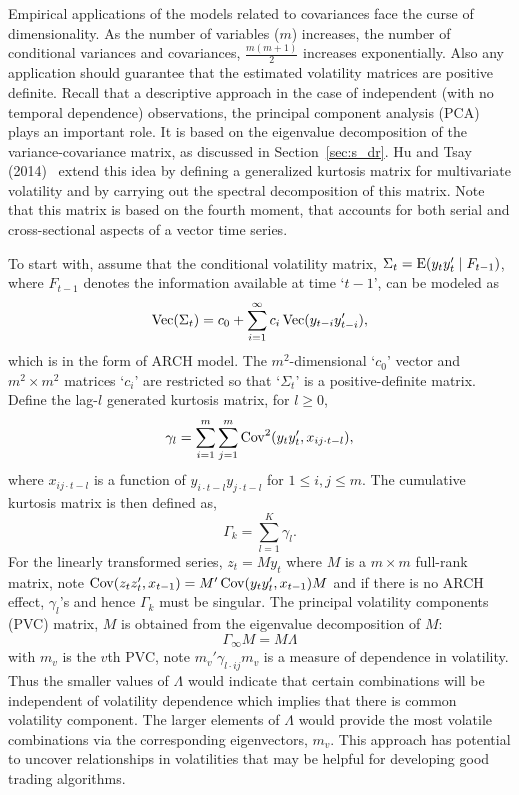 Empirical applications of the models related to covariances face the curse of dimensionality. As the number of variables ($m$) increases, the number of conditional variances and covariances, $\frac{m(m+1)}{2}$ increases exponentially. Also any application should guarantee that the estimated volatility matrices are positive definite. Recall that a descriptive approach in the case of independent (with no temporal dependence) observations, the principal component analysis (PCA) plays an important role. It is based on the eigenvalue decomposition of the variance-covariance matrix, as discussed in Section~\ref{sec:s_dr}. Hu and Tsay (2014)~\cite{hutsay14} extend this idea by defining a generalized kurtosis matrix for multivariate volatility and by carrying out the spectral decomposition of this matrix. Note that this matrix is based on the fourth moment, that accounts for both serial and cross-sectional aspects of a vector time series.


To start with, assume that the conditional volatility matrix, $\Sigma_t= \operatorname{E}(y_ty_t' \;|\; F_{t-1})$, where $F_{t-1}$ denotes the information available at time `$t-1$', can be modeled as
	\begin{equation} \label{eqn:vtmodel}
	\tbvec(\Sigma_t)= c_0 + \sum_{i=1}^\infty c_i \tbvec(y_{t-i} y_{t-i}'),
	\end{equation}
which is in the form of ARCH model. The $m^2$-dimensional `$c_0$' vector and $m^2 \times m^2$ matrices `$c_i$' are restricted so that `$\Sigma_t$' is a positive-definite matrix. Define the lag-$l$ generated kurtosis matrix, for $l \geq 0$,
	\begin{equation} \label{eqn:kurtosismat}
	\gamma_l = \sum_{i=1}^m \sum_{j=1}^m \cov^2(y_t y_t', x_{ij \cdot t - l} ),
	\end{equation}
where $x_{ij \cdot t - l}$ is a function of $y_{i \cdot t-l} y_{j \cdot t-l}$ for $1 \leq i,j \leq m$. The cumulative kurtosis matrix is then defined as,
	\begin{equation} \label{eqn:cumkurt}
	\Gamma_k= \sum_{l=1}^K \gamma_l.
	\end{equation}
For the linearly transformed series, $z_t= My_t$ where $M$ is a $m \times m$ full-rank matrix, note $\operatorname{Cov}(z_tz_t', x_{t-1})=M' \operatorname{Cov}(y_ty_t', x_{t-1}) M$ and if there is no ARCH effect, $\gamma_l$'s and hence $\Gamma_k$ must be singular. The principal volatility components (PVC) matrix, $M$ is obtained from the eigenvalue decomposition of $M$:
	\begin{equation} \label{eqn:obtainM}
	\Gamma_\infty M= M \Lambda
	\end{equation}
with $m_v$ is the $v$th PVC, note $m_v' \gamma_{l \cdot ij} m_v$ is a measure of dependence in volatility. Thus the smaller values of $\Lambda$ would indicate that certain combinations will be independent of volatility dependence which implies that there is common volatility component. The larger elements of $\Lambda$ would provide the most volatile combinations via the corresponding eigenvectors, $m_v$. This approach has potential to uncover relationships in volatilities that may be helpful for developing good trading algorithms. \label{in:multgarch2}



